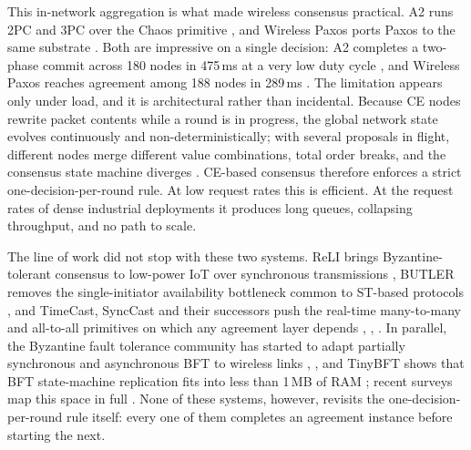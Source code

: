\documentclass[journal]{IEEEtran}
\newcommand{\CE}{CE}                      %
\newcommand{\ReLI}{ReLI}                  %
\begin{document}
This in-network aggregation is what made wireless consensus practical. A2
runs 2PC and 3PC over the Chaos primitive \cite{alnahas17a2}, and Wireless
Paxos ports Paxos to the same substrate \cite{poirot19paxos}. Both are
impressive on a single decision: A2 completes a two-phase commit across 180
nodes in 475\,ms at a very low duty cycle \cite{alnahas17a2}, and Wireless
Paxos reaches agreement among 188 nodes in 289\,ms \cite{poirot19paxos}.
The limitation appears only under load, and it is architectural rather than
incidental. Because \CE{} nodes rewrite packet contents while a round is in
progress, the global network state evolves continuously and
non-deterministically; with several proposals in flight, different nodes
merge different value combinations, total order breaks, and the consensus
state machine diverges \cite{alnahas17a2,poirot20thesis}. \CE-based
consensus therefore enforces a strict one-decision-per-round rule. At low
request rates this is efficient. At the request rates of dense industrial
deployments it produces long queues, collapsing throughput, and no path to
scale.

The line of work did not stop with these two systems. {\ReLI} brings
Byzantine-tolerant consensus to low-power IoT over synchronous
transmissions \cite{goyal22reli}, BUTLER removes the single-initiator
availability bottleneck common to ST-based protocols
\cite{mager22butler}, and TimeCast, SyncCast and their successors push
the real-time many-to-many and all-to-all primitives on which any
agreement layer depends \cite{debadarshini23timecast},
\cite{debadarshini23synccast}, \cite{debadarshini24structure}. In
parallel, the Byzantine fault tolerance community has started to adapt
partially synchronous and asynchronous BFT to wireless links
\cite{liu25partiallysync}, \cite{liu25asyncbft}, and TinyBFT shows that
BFT state-machine replication fits into less than 1\,MB of RAM
\cite{boehm24tinybft}; recent surveys map this space in full
\cite{zou24survey}. None of these systems, however, revisits the
one-decision-per-round rule itself: every one of them completes an
agreement instance before starting the next.
\end{document}
